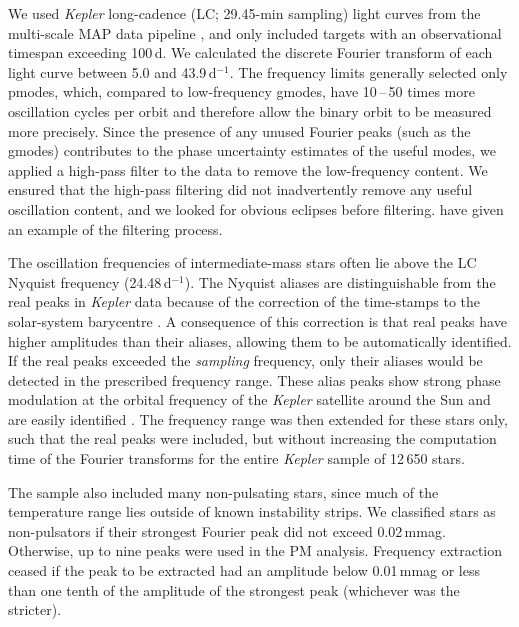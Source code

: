 \documentclass[a4paper,fleqn,usenatbib]{mnras}
\begin{document}
We used \textit{Kepler} long-cadence (LC; 29.45-min sampling) light curves from the multi-scale MAP data pipeline \citep{stumpeetal2014}, and only included targets with an observational timespan exceeding 100\,d. We calculated the discrete Fourier transform of each light curve between 5.0 and 43.9\,d$^{-1}$. The frequency limits generally selected only p\:modes, which, compared to low-frequency g\:modes, have 10\,--\,50 times more oscillation cycles per orbit and therefore allow the binary orbit to be measured more precisely. Since the presence of any unused Fourier peaks (such as the g\:modes) contributes to the phase uncertainty estimates of the useful modes, we applied a high-pass filter to the data to remove the low-frequency content. We ensured that the high-pass filtering did not inadvertently remove any useful oscillation content, and we looked for obvious eclipses before filtering. \citet{murphyetal2016c} have given an example of the filtering process.

The oscillation frequencies of intermediate-mass stars often lie above the LC Nyquist frequency (24.48\,d$^{-1}$). The Nyquist aliases are distinguishable from the real peaks in \textit{Kepler} data because of the correction of the time-stamps to the solar-system barycentre \citep{murphyetal2012b}. A consequence of this correction is that real peaks have higher amplitudes than their aliases, allowing them to be automatically identified. If the real peaks exceeded the {\it sampling} frequency, only their aliases would be detected in the prescribed frequency range. These alias peaks show strong phase modulation at the orbital frequency of the \textit{Kepler} satellite around the Sun and are easily identified \citep{murphyetal2014}. The frequency range was then extended for these stars only, such that the real peaks were included, but without increasing the computation time of the Fourier transforms for the entire \textit{Kepler} sample of 12\,650 stars.

The sample also included many non-pulsating stars, since much of the temperature range lies outside of known instability strips. We classified stars as non-pulsators if their strongest Fourier peak did not exceed 0.02\,mmag. Otherwise, up to nine peaks were used in the PM analysis. Frequency extraction ceased if the peak to be extracted had an amplitude below 0.01\,mmag or less than one tenth of the amplitude of the strongest peak (whichever was the stricter).
\end{document}
